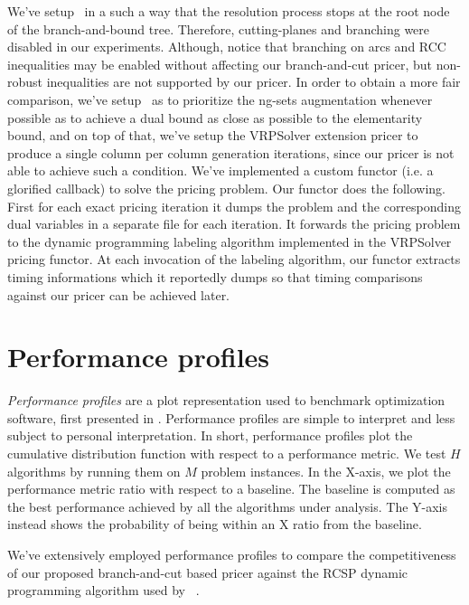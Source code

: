 We've setup \bapcod\ in a such a way that the resolution process stops at the root
node of the branch-and-bound tree.
Therefore, cutting-planes and branching were disabled in our experiments.
Although, notice that branching on arcs and RCC inequalities may be
enabled without affecting our branch-and-cut pricer, but non-robust
inequalities are not supported by our pricer.
In order to obtain a more fair comparison, we've setup \bapcod\ as to prioritize
the ng-sets augmentation whenever possible as to achieve a dual bound as close
as possible to the elementarity bound, and on top of that,
we've setup the VRPSolver extension pricer to produce a single column
per column generation iterations, since our pricer is not able to achieve
such a condition.
We've implemented a custom functor (i.e. a glorified callback) to solve the pricing problem.
Our functor does the following.
First for each exact pricing iteration it dumps the problem and the corresponding dual variables
in a separate file for each iteration.
It forwards the pricing problem to the dynamic programming labeling algorithm
implemented in the VRPSolver pricing functor.
At each invocation of the labeling algorithm, our functor extracts timing informations
which it reportedly dumps so that timing comparisons against our pricer can be achieved later.

\section{Performance profiles}
\label{sec:results-performance-profiles}

\textit{Performance profiles} are a plot representation used to benchmark optimization software,
first presented in \textcite{dolan2002}.
Performance profiles are simple to interpret and less subject to personal interpretation.
In short, performance profiles plot the cumulative distribution function with respect to a performance metric.
We test $H$ algorithms by running them on $M$ problem instances.
In the X-axis, we plot the performance metric ratio with respect to a baseline.
The baseline is computed as the best performance achieved by all the algorithms under analysis.
The Y-axis instead shows the probability of being within an X ratio from the baseline.

\medskip

We've extensively employed performance profiles to compare the competitiveness of
our proposed branch-and-cut based pricer
against the RCSP dynamic programming algorithm used by \bapcod\ \parencite{pessoa2020a}.

